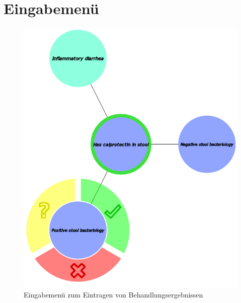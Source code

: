 \section{Eingabemenü}\label{sec:eingabemenu}
\begin{figure}
	\centering
	\includegraphics[width=.6\linewidth]{../screenshots/eingabemenu.PNG}
	\caption{Eingabemenü zum Eintragen von Behandlungsergebnissen}
	\label{abb:eingabemenu}
\end{figure} 
